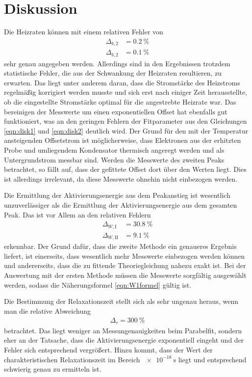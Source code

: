 \section{Diskussion}
\label{sec:Diskussion}

Die Heizraten können mit einem relativen Fehler von
\begin{align}
  \Delta_{b,2} &= \SI{0.2}{\percent} \\
  \Delta_{b,2} &= \SI{0.1}{\percent}
\end{align}
sehr genau angegeben werden. Allerdings sind in den Ergebnissen trotzdem statistische Fehler,
die aus der Schwankung der Heizraten resultieren, zu erwarten. Das liegt unter anderem
daran, dass die Stromstärke des Heizstroms regelmäßig korrigiert werden musste und sich erst
nach einiger Zeit herausstellte, ob die eingestellte Stromstärke optimal für die angestrebte
Heizrate war. Das bereinigen der Messwerte um einen exponentiellen Offset hat ebenfalls gut funktioniert,
was an den geringen Fehlern der Fitparameter aus den Gleichungen \eqref{eqn:disk1} und \eqref{eqn:disk2} deutlich
wird. Der Grund für den mit der Temperatur ansteigenden Offsetstrom ist möglicherweise, dass
Elektronen aus der erhitzten Probe und umliegendem Kondensator thermisch angeregt werden und als
Untergrundstrom messbar sind. Werden die Messwerte des zweiten Peaks betrachtet, so fällt auf, dass der
gefittete Offset dort über den Werten liegt. Dies ist allerdings irrelevant, da diese Messwerte ohnehin
nicht einbezogen werden.

Die Ermittlung der Aktivierungsenergie aus dem Peakanstieg ist wesentlich
unzuverlässiger als die Ermittlung der Aktivierungsenergie aus dem gesamten Peak. Das ist vor Allem an
den relativen Fehlern
\begin{align}
  \Delta_{W,\text{I}} &= \SI{30.8}{\percent} \\
  \Delta_{W,\text{II}} &= \SI{9.1}{\percent}
\end{align}
erkennbar. Der Grund dafür, dass die zweite Methode ein genaueres Ergebnis liefert, ist einerseits, dass wesentlich
mehr Messwerte einbezogen werden können und andererseits, dass die zu fittende Theoriegleichung nahezu exakt ist.
Bei der Auswertung mit der ersten Methode müssen die Messwerte sorgfältig ausgewählt werden, sodass
die Näherungsformel \eqref{eqn:W1formel} gültig ist.

Die Bestimmung der Relaxationszeit stellt sich als sehr ungenau heraus, wenn man die relative Abweichung
\begin{align}
  \Delta_{\tau} = \SI{300}{\percent}
\end{align}
betrachtet. Das liegt weniger an Messungenauigkeiten beim Parabelfit, sondern eher an der Tatsache, dass
die Aktivierungsenergie exponentiell eingeht und der Fehler sich entsprechend vergrößert. Hinzu kommt, dass
der Wert der charakteristischen Relaxationszeit im Bereich $\SI{e-18}{\second}$ liegt und entsprechend
schwierig genau zu ermitteln ist.
